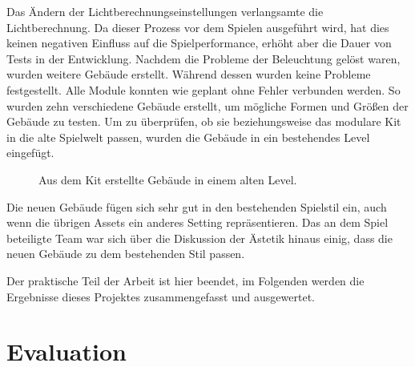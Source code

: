 \vspace{-10.5pt}
Das Ändern der Lichtberechnungseinstellungen verlangsamte die Lichtberechnung. Da dieser Prozess vor dem Spielen ausgeführt wird, hat dies keinen negativen Einfluss auf die Spielperformance, erhöht aber die Dauer von Tests in der Entwicklung. Nachdem die Probleme der Beleuchtung gelöst waren, wurden weitere Gebäude erstellt.
\newpage
Während dessen wurden keine Probleme festgestellt. Alle Module konnten wie geplant ohne Fehler verbunden werden. So wurden zehn verschiedene Gebäude erstellt, um mögliche Formen und Größen der Gebäude zu testen. Um zu überprüfen, ob sie beziehungsweise das modulare Kit in die alte Spielwelt passen, wurden die Gebäude in ein bestehendes Level eingefügt.
\begin{figure}[H]
\centering
  \caption{Aus dem Kit erstellte Gebäude in einem alten Level.}
	\label{stilTest}
\end{figure}
\vspace{-10.5pt}
Die neuen Gebäude fügen sich sehr gut in den bestehenden Spielstil ein, auch wenn die übrigen Assets ein anderes Setting repräsentieren. Das an dem Spiel beteiligte Team war sich über die Diskussion der Ästetik hinaus einig, dass die neuen Gebäude zu dem bestehenden Stil passen.
\par
Der praktische Teil der Arbeit ist hier beendet, im Folgenden werden die Ergebnisse dieses Projektes zusammengefasst und ausgewertet.
\chapter{Evaluation}
